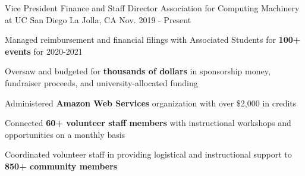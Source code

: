 
\begin{cventries}

  \cventry
    {Vice President Finance and Staff Director} %
    {Association for Computing Machinery at UC San Diego} %
    {La Jolla, CA} %
    {Nov. 2019 - Present} %
    {
      \begin{cvitems} %
        \item {Managed reimbursement and financial filings with Associated Students for \textbf{100+ events} for 2020-2021}
        \item {Oversaw and budgeted for \textbf{thousands of dollars} in sponsorship money, fundraiser proceeds, and university-allocated funding}
        \item {Administered \textbf{Amazon Web Services } organization with over \$2,000 in credits}
        \item {Connected \textbf{60+ volunteer staff members} with instructional workshops and opportunities on a monthly basis}
        \item {Coordinated volunteer staff in providing logistical and instructional support to \textbf{850+ community members}}
      \end{cvitems}
    }



\end{cventries}

